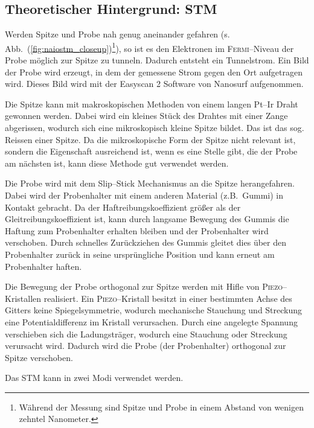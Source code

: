 \documentclass[sn-mathphys-num,iicol]{sn-jnl}
\theoremstyle{thmstyleone}
\theoremstyle{thmstyletwo}
\theoremstyle{thmstylethree}
\begin{document}
\subsection{Theoretischer Hintergrund: STM}
Werden Spitze und Probe nah genug aneinander gefahren (s. Abb.\ (\ref{fig:naiostm_closeup})\footnote{Während der Messung sind Spitze und Probe in einem Abstand von wenigen zehntel Nanometer.}), so ist es den Elektronen im \textsc{Fermi}--Niveau der Probe möglich zur Spitze zu tunneln.
Dadurch entsteht ein Tunnelstrom.
Ein Bild der Probe wird erzeugt, in dem der gemessene Strom gegen den Ort aufgetragen wird.
Dieses Bild wird mit der \glqq Easyscan 2\grqq{} Software von Nanosurf aufgenommen.

Die Spitze kann mit makroskopischen Methoden von einem langen Pt--Ir Draht gewonnen werden.
Dabei wird ein kleines Stück des Drahtes mit einer Zange abgerissen, wodurch sich eine mikroskopisch kleine Spitze bildet. Das ist das sog. Reissen einer Spitze.
Da die mikroskopische Form der Spitze nicht relevant ist, sondern die Eigenschaft ausreichend ist, wenn es eine Stelle gibt, die der Probe am nächsten ist, kann diese Methode gut verwendet werden. %

Die Probe wird mit dem Slip--Stick Mechanismus an die Spitze herangefahren.
Dabei wird der Probenhalter mit einem anderen Material (z.B.\ Gummi) in Kontakt gebracht.
Da der Haftreibungskoeffizient größer als der Gleitreibungskoeffizient ist, kann durch langsame Bewegung des Gummis die Haftung zum Probenhalter erhalten bleiben und der Probenhalter wird verschoben.
Durch schnelles Zurückziehen des Gummis gleitet dies über den Probenhalter zurück in seine ursprüngliche Position und kann erneut am Probenhalter haften.

Die Bewegung der Probe orthogonal zur Spitze werden mit Hifle von \textsc{Piezo}--Kristallen realisiert.
Ein \textsc{Piezo}--Kristall besitzt in einer bestimmten Achse des Gitters keine Spiegelsymmetrie, wodurch mechanische Stauchung und Streckung eine Potentialdifferenz im Kristall verursachen.
Durch eine angelegte Spannung verschieben sich die Ladungsträger, wodurch eine Stauchung oder Streckung verursacht wird.
Dadurch wird die Probe (der Probenhalter) orthogonal zur Spitze verschoben.

Das STM kann in zwei Modi verwendet werden.
\end{document}
